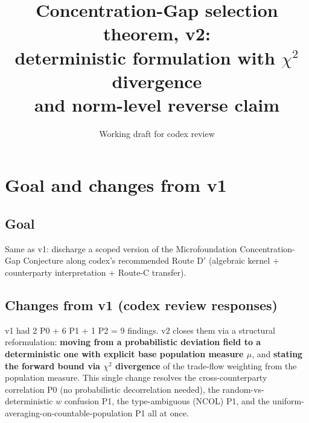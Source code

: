 \documentclass{article}
\title{Concentration-Gap selection theorem, v2: \\
deterministic formulation with $\chi^2$ divergence \\
and norm-level reverse claim}
\author{Working draft for codex review}
\date{}
\begin{document}
\maketitle

\section{Goal and changes from v1}

\subsection{Goal}

Same as v1: discharge a scoped version of the Microfoundation
Concentration-Gap Conjecture along codex's recommended Route D$'$
(algebraic kernel + counterparty interpretation + Route-C transfer).

\subsection{Changes from v1 (codex review responses)}

v1 had 2 P0 + 6 P1 + 1 P2 = 9 findings.  v2 closes them via a
structural reformulation: \textbf{moving from a probabilistic
deviation field to a deterministic one with explicit base population
measure $\mu$}, and \textbf{stating the forward bound via $\chi^2$
divergence} of the trade-flow weighting from the population measure.
This single change resolves the cross-counterparty correlation P0
(no probabilistic decorrelation needed), the random-vs-deterministic
$w$ confusion P1, the type-ambiguous (NCOL) P1, and the
uniform-averaging-on-countable-population P1 all at once.
\end{document}
